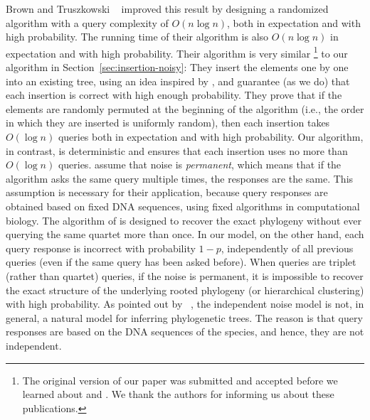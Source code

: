 Brown and Truszkowski%
~\cite{brown-truszkowski:2011:phylogeny-quartet,%
brown-truszkowski:2011:phylogeny-quartet-practical}
improved this result by designing a randomized algorithm
with a query complexity of $O(n \log n)$,
both in expectation and with high probability.
The running time of their algorithm
is also $O(n \log n)$ in expectation and with high probability.
Their algorithm is very similar%
\footnote{The original version of our paper was submitted and accepted
before we learned about
\cite{brown-truszkowski:2011:phylogeny-quartet} and
\cite{brown-truszkowski:2011:phylogeny-quartet-practical}.
We thank the authors for informing us about these publications.}
to our algorithm in Section~\ref{sec:insertion-noisy}:
They insert the elements one by one into an existing tree,
using an idea inspired by \cite{feige-raghavan-peleg-upfal:1994:noisy},
and guarantee (as we do) that each insertion is correct
with high enough probability.
They prove that if the elements are
randomly permuted at the beginning of the algorithm
(i.e., the order in which they are inserted is uniformly random),
then each insertion takes $O(\log n)$ queries
both in expectation and with high probability.
Our algorithm, in contrast, is deterministic
and ensures that each insertion uses
no more than $O(\log n)$ queries.
\cite{brown-truszkowski:2011:phylogeny-quartet}
assume that noise is \emph{permanent},
which means that if the algorithm asks the same query multiple times,
the responses are the same.
This assumption is necessary for their application,
because query responses are obtained
based on fixed DNA sequences,
using fixed algorithms in computational biology.
The algorithm of \cite{brown-truszkowski:2011:phylogeny-quartet}
is designed to recover the exact phylogeny
without ever querying the same quartet more than once.
In our model, on the other hand, each query response is incorrect
with probability $1 - p$, independently of all previous queries
(even if the same query has been asked before).
When queries are triplet (rather than quartet) queries,
if the noise is permanent, it is impossible
to recover the exact structure of the underlying rooted phylogeny
(or hierarchical clustering) with high probability.
As pointed out by~%
\cite{brown-truszkowski:2011:phylogeny-quartet,%
brown-truszkowski:2011:phylogeny-quartet-practical},
the independent noise model is not, in general,
a natural model for inferring phylogenetic trees.
The reason is that query responses are based on the DNA
sequences of the species, and hence, they are not independent.

